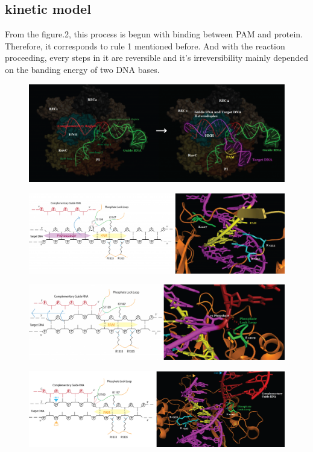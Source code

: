 \documentclass[a4paper,10pt]{article}
\begin{document}
	\subsection{kinetic model}
	From the figure.2, this process is begun with binding between PAM and protein. Therefore, it corresponds to rule 1 mentioned before. And with the reaction proceeding, every steps in it are reversible and it’s irreversibility mainly depended on the banding energy of two DNA bases.
	\begin{figure}
		\centering
		\includegraphics[width=0.7\linewidth]{2}
		\caption{}
		\label{fig:2}
	\end{figure}
	\begin{figure}
		\centering
		\includegraphics[width=0.7\linewidth]{3}
		\caption{}
		\label{fig:3}
	\end{figure}
	\begin{figure}
		\centering
		\includegraphics[width=0.7\linewidth]{4}
		\caption{}
		\label{fig:4}
	\end{figure}
	\begin{figure}
		\centering
		\includegraphics[width=0.7\linewidth]{5}
		\caption{}
		\label{fig:5}
	\end{figure}
	
\end{document}
